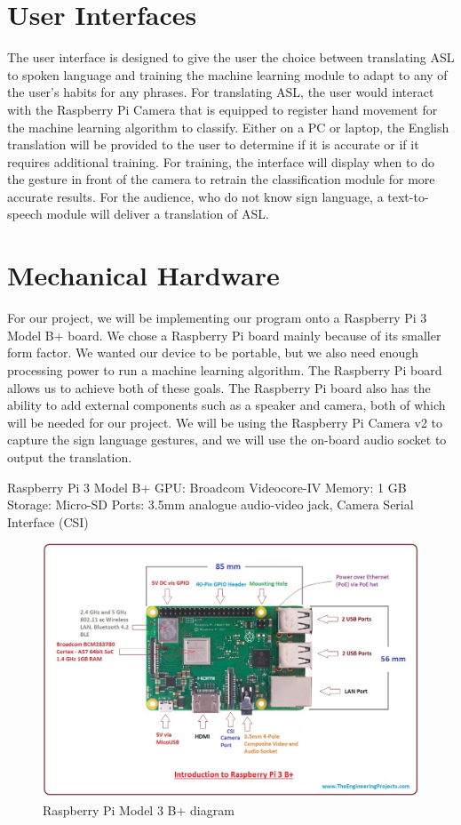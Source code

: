 \documentclass[12pt, titlepage]{article}
\begin{document}
\section{User Interfaces}

The user interface is designed to give the user the choice between translating ASL to spoken language and training the machine learning module to adapt 
to any of the user’s habits for any phrases. For translating ASL, the user would interact with the Raspberry Pi Camera that is equipped to register hand 
movement for the machine learning algorithm to classify. Either on a PC or laptop, the English translation will be provided to the user to determine if 
it is accurate or if it requires additional training. For training, the interface will display when to do the gesture in front of the camera to retrain 
the classification module for more accurate results. For the audience, who do not know sign language, a text-to-speech module will deliver a translation of ASL.

\section{Mechanical Hardware}

For our project, we will be implementing our program onto a Raspberry Pi 3 Model B+ board. We chose a Raspberry Pi board mainly because of its smaller form 
factor. We wanted our device to be portable, but we also need enough processing power to run a machine learning algorithm. The Raspberry Pi board allows us 
to achieve both of these goals. The Raspberry Pi board also has the ability to add external components such as a speaker and camera, both of which will be 
needed for our project. We will be using the Raspberry Pi Camera v2 to capture the sign language gestures, and we will use the on-board audio socket to output 
the translation.

Raspberry Pi 3 Model B+
GPU: Broadcom Videocore-IV
Memory: 1 GB
Storage: Micro-SD
Ports: 3.5mm analogue audio-video jack, Camera Serial Interface (CSI)

\begin{figure}[H] 
\centering
\includegraphics[width=\textwidth,height=0.88\textheight,keepaspectratio]{PiBoard.jpg} 
\caption{Raspberry Pi Model 3 B+ diagram} 
\label{Fig.Pi_Board} 
\end{figure}
\end{document}
